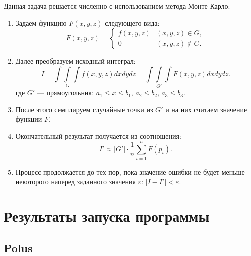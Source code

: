 \documentclass[a4paper, 12pt]{article}
\begin{document}
    Данная задача решается численно с использованием метода Монте-Карло: 
    \begin{enumerate}
        \item Задаем функцию $F(x, y, z)$ следующего вида:
            \begin{equation}
                F\left(x, y, z\right) = \left\{
                    \begin{array}{ll}
                        f\left(x, y, z\right) & \left(x, y, z\right) \in G, \\
                        0 & \left(x, y, z\right) \not\in G.
                    \end{array}
                \right.
            \end{equation}
        \item Далее преобразуем исходный интеграл:
            \begin{equation}
                I = \int\int\limits_{G}\int f\left(x, y, z\right)dxdydz = \int\int\limits_{G'}\int F\left(x, y, z\right) dxdydz.
            \end{equation}
            где $G'$ --- прямоугольник: $a_1 \leq x \leq b_1$, $a_2 \leq b_2$, $a_3 \leq b_3$.
        \item После этого семплируем случайные точки из $G'$ и на них считаем значение функции $F$.
        \item Окончательный результат получается из соотношения:
            \begin{equation}
                I' \approx \rvert G' \rvert \cdot \frac{1}{n} \sum\limits_{i = 1}^n F(p_i).
            \end{equation}
        \item Процесс продолжается до тех пор, пока значение ошибки не будет меньше некоторого наперед заданного значения $\varepsilon$: $|I - I'| < \varepsilon$.
    \end{enumerate}

\section{Результаты запуска программы}


\subsection{Polus}
\end{document}
